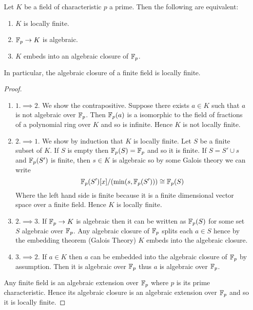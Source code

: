 \begin{lem}
    Let $K$ be a field of characteristic $p$ a prime.
    Then the following are equivalent:
    \begin{enumerate}
        \item $K$ is locally finite.
        \item $\mathbb{F}_p \to K$ is algebraic.
        \item $K$ embeds into an algebraic closure of $\mathbb{F}_p$.
    \end{enumerate}
    In particular, the algebraic closure of a finite field is locally finite.
\end{lem}
\begin{proof}~
    \begin{enumerate}
        \item[{}]$1.\implies 2.$ We show the contrapositive.
            Suppose there exists $a \in K$ such that $a$
            is not algebraic over $\mathbb{F}_p$. 
            Then $\mathbb{F}_p(a)$ is a isomorphic to the field of fractions
            of a polynomial ring over $K$ and so is infinite.
            Hence $K$ is not locally finite.
        \item[{}]$2. \implies 1.$ We show by induction that $K$ is locally 
            finite.  
            Let $S$ be a finite subset of $K$.
            If $S$ is empty then $\mathbb{F}_p(S) = \mathbb{F}_p$ and so it is finite.
            If $S = S' \cup {s}$ and $\mathbb{F}_p(S')$ is finite,
            then $s \in K$ is algebraic so by some Galois theory we can write%
            \[\mathbb{F}_p(S')[x] / (\min(s, \mathbb{F}_p(S'))) \cong \mathbb{F}_p(S)\]
            Where the left hand side is finite because it is a finite 
            dimensional vector space over a finite field.
            Hence $K$ is locally finite.
        \item[{}]$2. \implies 3.$ If $\mathbb{F}_p \to K$ is algebraic then 
            it can be written as $\mathbb{F}_p(S)$ 
            for some set $S$ algebraic over $\mathbb{F}_p$. 
            Any algebraic closure of $\mathbb{F}_p$ splits each $a \in S$ hence by the 
            embedding theorem (Galois Theory)%
            $K$ embeds into the algebraic closure.
        \item[{}]$3. \implies 2.$ If $a \in K$ then $a$ can be embedded into 
            the algebraic closure of $\mathbb{F}_p$ by assumption.
            Then it is algebraic over $\mathbb{F}_p$ thus $a$ is algebraic over $\mathbb{F}_p$.
    \end{enumerate}
    Any finite field is an algebraic extension over $\mathbb{F}_p$ where $p$ is its
    prime characteristic.
    Hence its algebraic closure is an algebraic extension over $\mathbb{F}_p$ and so 
    it is locally finite.
\end{proof}

